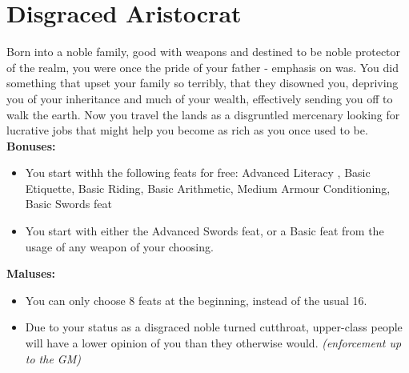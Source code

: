 \section{Disgraced Aristocrat}
Born into a noble family, good with weapons and destined to be noble protector of the realm, you were once the pride of your father - emphasis on was. You did something that upset your family so terribly, that they disowned you, depriving you of your inheritance and much of your wealth, effectively sending you off to walk the earth. Now you travel the lands as a disgruntled mercenary looking for lucrative jobs that might help you become as rich as you once used to be.\newline
\textbf{Bonuses:}
\begin{itemize}
	\item You start withh the following feats for free: Advanced Literacy , Basic Etiquette, Basic Riding, Basic Arithmetic, Medium Armour Conditioning, Basic Swords feat
	\item You start with either the Advanced Swords feat, or a Basic feat from the usage of any weapon of your choosing.
\end{itemize}
\textbf{Maluses:}
\begin{itemize}
	\item You can only choose 8 feats at the beginning, instead of the usual 16.
	\item Due to your status as a disgraced noble turned cutthroat, upper-class people will have a lower opinion of you than they otherwise would. \textit{(enforcement up to the GM)}
\end{itemize}
